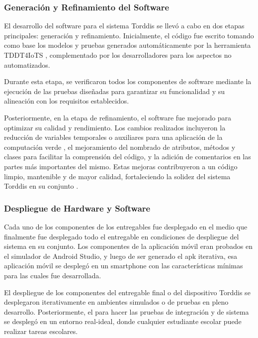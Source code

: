 \documentclass[a4paper,fleqn]{cas-sc}
\begin{document}
			\subsubsection{Generación y Refinamiento del Software} 
				El desarrollo del software para el sistema Torddis se llevó a cabo en dos etapas principales: generación y refinamiento. Inicialmente, el código fue escrito tomando como base los modelos y pruebas generados automáticamente por la herramienta TDDT4IoTS \citep{Guerrero2024Test}, complementado por los desarrolladores para los aspectos no automatizados. 
			
				Durante esta etapa, se verificaron todos los componentes de software mediante la ejecución de las pruebas diseñadas para garantizar su funcionalidad y su alineación con los requisitos establecidos.
			
				Posteriormente, en la etapa de refinamiento, el software fue mejorado para optimizar su calidad y rendimiento. Los cambios realizados incluyeron la reducción de variables temporales o auxiliares para una aplicación de la computación verde \citep{Firmansyah2024Integrating}, el mejoramiento del nombrado de atributos, métodos y clases para facilitar la comprensión del código, y la adición de comentarios en las partes más importantes del mismo. Estas mejoras contribuyeron a un código limpio, mantenible y de mayor calidad, fortaleciendo la solidez del sistema Torddis en su conjunto \citep{Marabesi2024Exploring}.
			
			\subsubsection{Despliegue de Hardware y Software}
				Cada uno de los componentes de los entregables fue  desplegado en el medio que finalmente fue desplegado todo el entregable en condiciones de despliegue del sistema en su conjunto. Los componentes de la aplicación móvil eran probados en el simulador de Android Studio, y luego de ser generado el apk iterativa, esa aplicación móvil se desplegó en un smartphone con las características mínimas para las cuales fue desarrollada.
			
				El despliegue de los componentes del entregable final o del dispositivo Torddis se desplegaron iterativamente en ambientes simulados o de pruebas en pleno desarrollo. Posteriormente, el para hacer las pruebas de integración y de sistema se desplegó en un entorno real-ideal, donde cualquier estudiante escolar puede realizar tareas escolares.
			
\end{document}
